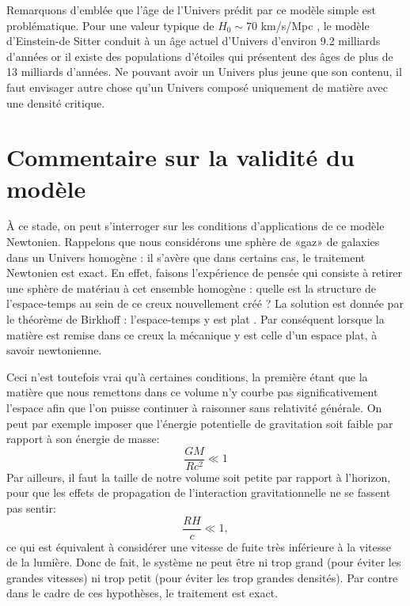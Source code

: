 Remarquons d'emblée que l'âge de l'Univers prédit par ce modèle simple est problématique. Pour une valeur typique de $H_0\sim 70$ km/s/Mpc , le modèle d'Einstein-de Sitter conduit à un âge actuel d'Univers d'environ 9.2 milliards d'années or il existe des populations d'étoiles qui présentent des âges de plus de 13 milliards d'années. Ne pouvant avoir un Univers plus jeune que son contenu, il faut envisager autre chose qu'un Univers composé uniquement de matière avec une densité critique.

\section{Commentaire sur la validité du modèle}
À ce stade, on peut s'interroger sur les conditions d'applications de ce modèle Newtonien. Rappelons que nous considérons une sphère de «gaz» de galaxies dans un Univers homogène : il s'avère que dans certains cas, le traitement Newtonien est exact. En effet, faisons l'expérience de pensée qui consiste à retirer une sphère de matériau à cet ensemble homogène : quelle est la structure de l'espace-temps au sein de ce creux nouvellement créé ? La solution est donnée par le théorème de Birkhoff : l'espace-temps y est plat . Par conséquent lorsque la matière est remise dans ce creux la mécanique y est celle d'un espace plat, à savoir newtonienne.

Ceci n'est toutefois vrai qu'à certaines conditions, la première étant que la matière que nous remettons dans ce volume n'y courbe pas significativement l'espace afin que l'on puisse continuer à raisonner sans relativité générale. On peut par exemple imposer que l'énergie potentielle de gravitation soit faible par rapport à son énergie de masse:
\begin{equation}
\frac{GM}{Rc^2}\ll 1
\end{equation}
Par ailleurs, il faut la taille de notre volume soit petite par rapport à l'horizon, pour que les effets de propagation de l'interaction gravitationnelle  ne se fassent pas sentir:
\begin{equation}
\frac{RH}{c}\ll 1,
\end{equation}
ce qui est équivalent à considérer une vitesse de fuite très inférieure à la vitesse de la lumière. Donc de fait, le système ne peut être ni trop grand (pour éviter les grandes vitesses) ni trop petit (pour éviter les trop grandes densités). Par contre dans le cadre de ces hypothèses, le traitement est exact.

